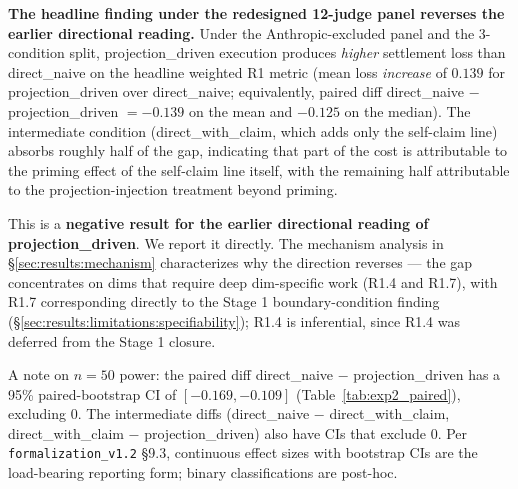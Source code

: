 \textbf{The headline finding under the redesigned 12-judge panel reverses the earlier directional reading.} Under the Anthropic-excluded panel and the 3-condition split, projection\_driven execution produces \emph{higher} settlement loss than direct\_naive on the headline weighted R1 metric (mean loss \emph{increase} of $0.139$ for projection\_driven over direct\_naive; equivalently, paired diff direct\_naive $-$ projection\_driven $= -0.139$ on the mean and $-0.125$ on the median). The intermediate condition (direct\_with\_claim, which adds only the self-claim line) absorbs roughly half of the gap, indicating that part of the cost is attributable to the priming effect of the self-claim line itself, with the remaining half attributable to the projection-injection treatment beyond priming.

This is a \textbf{negative result for the earlier directional reading of projection\_driven}. We report it directly. The mechanism analysis in \S\ref{sec:results:mechanism} characterizes why the direction reverses --- the gap concentrates on dims that require deep dim-specific work (R1.4 and R1.7), with R1.7 corresponding directly to the Stage 1 boundary-condition finding (\S\ref{sec:results:limitations:specifiability}); R1.4 is inferential, since R1.4 was deferred from the Stage 1 closure.

A note on $n = 50$ power: the paired diff direct\_naive $-$ projection\_driven has a 95\% paired-bootstrap CI of $[-0.169, -0.109]$ (Table~\ref{tab:exp2_paired}), excluding $0$. The intermediate diffs (direct\_naive $-$ direct\_with\_claim, direct\_with\_claim $-$ projection\_driven) also have CIs that exclude $0$. Per \texttt{formalization\_v1.2} \S9.3, continuous effect sizes with bootstrap CIs are the load-bearing reporting form; binary classifications are post-hoc.

